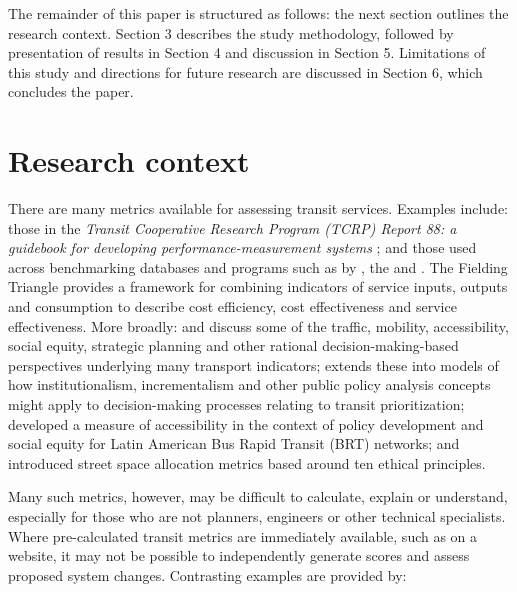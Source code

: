 \documentclass[preprint, 3p,
authoryear]{elsarticle} %
\begin{document}
The remainder of this paper is structured as follows: the next section
outlines the research context. Section 3 describes the study
methodology, followed by presentation of results in Section 4 and
discussion in Section 5. Limitations of this study and directions for
future research are discussed in Section 6, which concludes the paper.

\section{Research context}\label{research-context}

There are many metrics available for assessing transit services.
Examples include: those in the \emph{Transit Cooperative Research
Program (TCRP) Report 88: a guidebook for developing
performance-measurement systems} \citep{Ryus:2003aa}; and those used
across benchmarking databases and programs such as by
\citet{Florida-Transit-Information-System:2018aa}, the
\citet{UITP:2015aa} and \citet{Imperial-College-London:2023aa}. The
Fielding Triangle \citep{FieldingGordonJ1987Mpts} provides a framework
for combining indicators of service inputs, outputs and consumption to
describe cost efficiency, cost effectiveness and service effectiveness.
More broadly: \citet{Litman:2003ab} and \citet{Litman:2016aa} discuss
some of the traffic, mobility, accessibility, social equity, strategic
planning and other rational decision-making-based perspectives
underlying many transport indicators; \citet{Reynolds:2017ah} extends
these into models of how institutionalism, incrementalism and other
public policy analysis concepts might apply to decision-making processes
relating to transit prioritization; \citet{GuzmanLuisA.2017Aeit}
developed a measure of accessibility in the context of policy
development and social equity for Latin American Bus Rapid Transit (BRT)
networks; and \citet{Creutzig2020streetspaceallocation} introduced
street space allocation metrics based around ten ethical principles.

Many such metrics, however, may be difficult to calculate, explain or
understand, especially for those who are not planners, engineers or
other technical specialists. Where pre-calculated transit metrics are
immediately available, such as on a website, it may not be possible to
independently generate scores and assess proposed system changes.
Contrasting examples are provided by:
\end{document}
